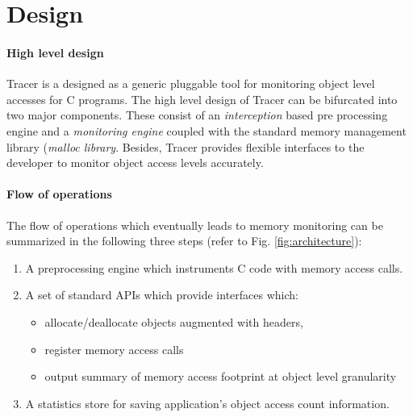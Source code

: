 \section{Design}
\label{sec:design}
\paragraph{High level design}
Tracer is a designed as a generic pluggable tool for monitoring object level accesses for C programs. The high level design of Tracer can be bifurcated into two major components. These consist of an {\emph{interception}} based pre processing engine and a {\emph{monitoring engine}} coupled with the standard memory management library ({\emph{malloc library}}. Besides, Tracer provides flexible interfaces to the developer to monitor object access levels accurately. 

\paragraph{Flow of operations}
The flow of operations which eventually leads to memory monitoring can be summarized in the following three steps (refer to Fig. \ref{fig:architecture}):
\begin{enumerate}
\item A preprocessing engine which instruments C code with memory access calls.
\item A set of standard APIs which provide interfaces which:
\begin{itemize}
\item allocate/deallocate objects augmented with headers, 
\item register memory access calls
\item output summary of memory access footprint at object level granularity
\end{itemize}
\item A statistics store for saving application's object access count information.
\end{enumerate}

